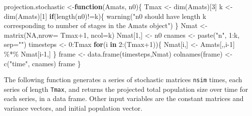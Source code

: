 \documentclass[
]{book}
\newenvironment{Shaded}{\begin{snugshade}}{\end{snugshade}}
\newcommand{\AttributeTok}[1]{\textcolor[rgb]{0.77,0.63,0.00}{#1}}
\newcommand{\ConstantTok}[1]{\textcolor[rgb]{0.00,0.00,0.00}{#1}}
\newcommand{\ControlFlowTok}[1]{\textcolor[rgb]{0.13,0.29,0.53}{\textbf{#1}}}
\newcommand{\DecValTok}[1]{\textcolor[rgb]{0.00,0.00,0.81}{#1}}
\newcommand{\FunctionTok}[1]{\textcolor[rgb]{0.00,0.00,0.00}{#1}}
\newcommand{\NormalTok}[1]{#1}
\newcommand{\OtherTok}[1]{\textcolor[rgb]{0.56,0.35,0.01}{#1}}
\newcommand{\SpecialCharTok}[1]{\textcolor[rgb]{0.00,0.00,0.00}{#1}}
\newcommand{\StringTok}[1]{\textcolor[rgb]{0.31,0.60,0.02}{#1}}
\begin{document}
\begin{Shaded}
\begin{Highlighting}[]
\NormalTok{projection.stochastic }\OtherTok{\textless{}{-}}\ControlFlowTok{function}\NormalTok{(Amats, n0)\{}
\NormalTok{    Tmax }\OtherTok{\textless{}{-}} \FunctionTok{dim}\NormalTok{(Amats)[}\DecValTok{3}\NormalTok{]}
\NormalTok{    k }\OtherTok{\textless{}{-}} \FunctionTok{dim}\NormalTok{(Amats)[}\DecValTok{1}\NormalTok{]}
    \ControlFlowTok{if}\NormalTok{(}\FunctionTok{length}\NormalTok{(n0)}\SpecialCharTok{!=}\NormalTok{k)\{}
      \FunctionTok{warning}\NormalTok{(}\StringTok{"n0 should have length k }
\StringTok{              corresponding to number of }
\StringTok{              stages in the Amats object"}\NormalTok{)}
\NormalTok{      \}}
\NormalTok{    Nmat }\OtherTok{\textless{}{-}} \FunctionTok{matrix}\NormalTok{(}\ConstantTok{NA}\NormalTok{,}\AttributeTok{nrow=}\NormalTok{ Tmax}\SpecialCharTok{+}\DecValTok{1}\NormalTok{, }\AttributeTok{ncol=}\NormalTok{k)}
\NormalTok{    Nmat[}\DecValTok{1}\NormalTok{,] }\OtherTok{\textless{}{-}}\NormalTok{ n0}
\NormalTok{  cnames }\OtherTok{\textless{}{-}} \FunctionTok{paste}\NormalTok{(}\StringTok{"n"}\NormalTok{, }\DecValTok{1}\SpecialCharTok{:}\NormalTok{k, }\AttributeTok{sep=}\StringTok{""}\NormalTok{)}
\NormalTok{  timesteps }\OtherTok{\textless{}{-}} \DecValTok{0}\SpecialCharTok{:}\NormalTok{Tmax}
    \ControlFlowTok{for}\NormalTok{(i }\ControlFlowTok{in} \DecValTok{2}\SpecialCharTok{:}\NormalTok{(Tmax}\SpecialCharTok{+}\DecValTok{1}\NormalTok{))\{  }
\NormalTok{        Nmat[i,] }\OtherTok{\textless{}{-}}\NormalTok{ Amats[,,i}\DecValTok{{-}1}\NormalTok{] }\SpecialCharTok{\%*\%}\NormalTok{ Nmat[i}\DecValTok{{-}1}\NormalTok{,]}
\NormalTok{        \}}
\NormalTok{  frame }\OtherTok{\textless{}{-}} \FunctionTok{data.frame}\NormalTok{(timesteps,Nmat)}
  \FunctionTok{colnames}\NormalTok{(frame) }\OtherTok{\textless{}{-}} \FunctionTok{c}\NormalTok{(}\StringTok{"time"}\NormalTok{, cnames)}
\NormalTok{  frame}
\NormalTok{\}}
\end{Highlighting}
\end{Shaded}

The following function generates a series of stochastic matrices \texttt{nsim} times, each series of length \texttt{Tmax}, and returns the projected total population size over time for each series, in a data frame. Other input variables are the constant matrices and variance vectors, and initial population vector.
\end{document}
